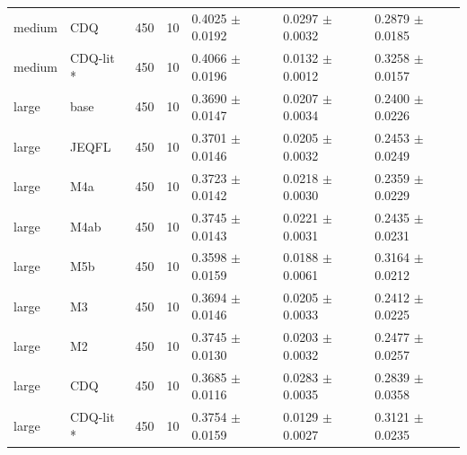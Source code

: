 \begin{table}[t]
\begin{tabular}{lllllll}
medium & CDQ & 450 & 10 & 0.4025 $\pm$ 0.0192 & 0.0297 $\pm$ 0.0032 & 0.2879 $\pm$ 0.0185 \\
medium & CDQ-lit * & 450 & 10 & 0.4066 $\pm$ 0.0196 & 0.0132 $\pm$ 0.0012 & 0.3258 $\pm$ 0.0157 \\
large & base & 450 & 10 & 0.3690 $\pm$ 0.0147 & 0.0207 $\pm$ 0.0034 & 0.2400 $\pm$ 0.0226 \\
large & JEQFL & 450 & 10 & 0.3701 $\pm$ 0.0146 & 0.0205 $\pm$ 0.0032 & 0.2453 $\pm$ 0.0249 \\
large & M4a & 450 & 10 & 0.3723 $\pm$ 0.0142 & 0.0218 $\pm$ 0.0030 & 0.2359 $\pm$ 0.0229 \\
large & M4ab & 450 & 10 & 0.3745 $\pm$ 0.0143 & 0.0221 $\pm$ 0.0031 & 0.2435 $\pm$ 0.0231 \\
large & M5b & 450 & 10 & 0.3598 $\pm$ 0.0159 & 0.0188 $\pm$ 0.0061 & 0.3164 $\pm$ 0.0212 \\
large & M3 & 450 & 10 & 0.3694 $\pm$ 0.0146 & 0.0205 $\pm$ 0.0033 & 0.2412 $\pm$ 0.0225 \\
large & M2 & 450 & 10 & 0.3745 $\pm$ 0.0130 & 0.0203 $\pm$ 0.0032 & 0.2477 $\pm$ 0.0257 \\
large & CDQ & 450 & 10 & 0.3685 $\pm$ 0.0116 & 0.0283 $\pm$ 0.0035 & 0.2839 $\pm$ 0.0358 \\
large & CDQ-lit * & 450 & 10 & 0.3754 $\pm$ 0.0159 & 0.0129 $\pm$ 0.0027 & 0.3121 $\pm$ 0.0235 \\
\bottomrule
\end{tabular}
\end{table}